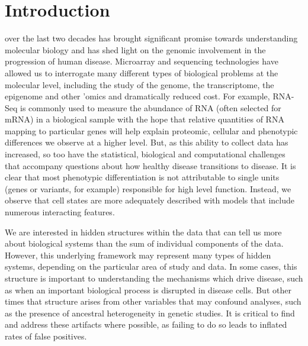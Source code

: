 \chapter{Introduction}
\label{introduction}
 over the last two decades has brought significant promise towards understanding molecular biology and has shed light on the genomic involvement in the progression of human disease. Microarray and sequencing technologies have allowed us to interrogate many different types of biological problems at the molecular level, including the study of the genome, the transcriptome, the epigenome and other 'omics and dramatically reduced cost. For example, RNA-Seq is commonly used to measure the abundance of RNA (often selected for mRNA) in a biological sample with the hope that relative quantities of RNA mapping to particular genes will help explain proteomic, cellular and phenotypic differences we observe at a higher level. But, as this ability to collect data has increased, so too have the statistical, biological and computational challenges that accompany questions about how healthy disease transitions to disease. It is clear that most phenotypic differentiation is not attributable to single units (genes or variants, for example) responsible for high level function. Instead, we observe that cell states are more adequately described with models that include numerous interacting features. 

We are interested in hidden structures within the data that can tell us more about biological systems than the sum of individual components of the data. However, this underlying framework may represent many types of hidden systems, depending on the particular area of study and data. In some cases, this structure is important to understanding the mechanisms which drive disease, such as when an important biological process is disrupted in disease cells. But other times that structure arises from other variables that may confound analyses, such as the presence of ancestral heterogeneity in genetic studies. It is critical to find and address these artifacts where possible, as failing to do so leads to inflated rates of false positives.

